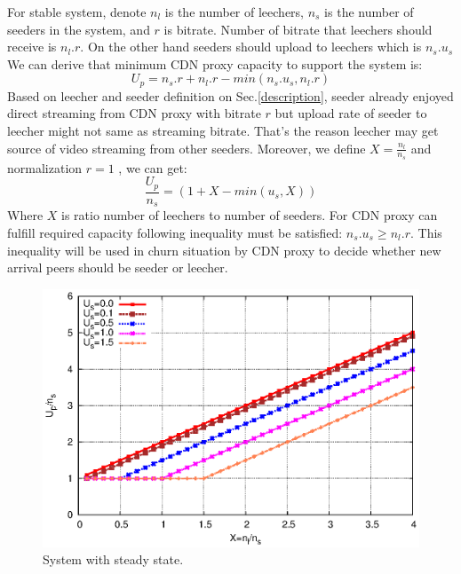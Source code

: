 \documentclass[paper]{ieice}
\begin{document}
For stable system, denote $n_l$ is the number of leechers, $n_s$ is the number of seeders in the system, and $r$ is bitrate.
Number of bitrate that leechers should receive is $n_l.r$. 
On the other hand seeders should upload to leechers which is $n_s.u_s$
We can derive that minimum CDN proxy capacity to support the system is:
\begin{equation}
	U_p = n_s.r + n_l.r - min(n_s.u_s, n_l.r)
\end{equation}
Based on leecher and seeder definition on Sec.\ref{description}, seeder already enjoyed direct streaming from CDN proxy with bitrate $r$ but upload rate of seeder to leecher might not same as streaming bitrate. 
That's the reason leecher may get source of video streaming from other seeders.  
Moreover, we define $X=\frac{n_l}{n_s}$ and normalization $r=1$ , we can get:
\begin{equation}
	\frac{U_p}{n_s} = (1 + X - min (u_s,X))
\end{equation}
Where $X$ is ratio number of leechers to number of seeders.
For CDN proxy can fulfill required capacity following inequality must be satisfied: $n_s.u_s \ge n_l.r$.
This inequality will be used in churn situation by CDN proxy to decide whether new arrival peers should be seeder or leecher.

\begin{figure}[hb] 
\begin{center}
\includegraphics[scale=0.5]{graphs/stable-steady-state.eps}
\end{center}
\caption{System with steady state.}
\label{fig:steadystate}
\vspace{-2mm}
 \end{figure}
 
\end{document}
